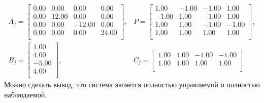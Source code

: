 \begin{equation}
    \begin{array}{cccc}
        A_j = \begin{bmatrix}
            0.00  & 0.00  & 0.00  & 0.00 \\ 
            0.00  & 12.00  & 0.00  & 0.00 \\ 
            0.00  & 0.00  & -12.00  & 0.00 \\ 
            0.00  & 0.00  & 0.00  & 24.00 \\ 
            \end{bmatrix}, &
        P = \begin{bmatrix}
            1.00  & -1.00  & -1.00  & 1.00 \\ 
            -1.00  & 1.00  & -1.00  & 1.00 \\ 
            1.00  & 1.00  & -1.00  & -1.00 \\ 
            1.00  & 1.00  & 1.00  & 1.00 \\ 
            \end{bmatrix}, \\
        B_j = \begin{bmatrix}
            1.00 \\ 
            4.00 \\ 
            -5.00 \\ 
            4.00 \\ 
            \end{bmatrix}, &
        C_j = \begin{bmatrix}
            1.00  & 1.00  & -1.00  & -1.00 \\ 
            1.00  & 1.00  & 1.00  & 1.00 \\ 
            \end{bmatrix}   
    \end{array}
\end{equation}
Можно сделать вывод, что система является полностью управляемой и полностью наблюдаемой.

